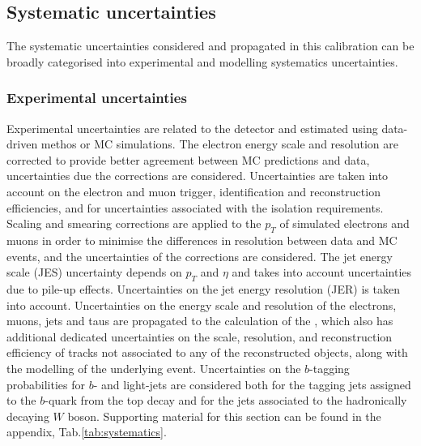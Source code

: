 \documentclass[letterpaper,12pt]{article}
\begin{document}
\subsection{Systematic uncertainties}
\label{sec:FTAG_systematics}
The systematic uncertainties considered and propagated in this calibration 
can be broadly categorised into experimental and modelling systematics uncertainties. 
\subsubsection{Experimental uncertainties}

Experimental uncertainties are related to the detector and estimated using 
data-driven methos or MC simulations. 
The electron energy scale and resolution are corrected to 
provide better agreement between MC predictions and data, uncertainties 
due the corrections are considered. Uncertainties are taken into account on the 
electron and muon trigger, identification and reconstruction efficiencies, and for 
uncertainties associated with the isolation requirements. 
Scaling and smearing corrections are applied 
to the $p_T$ of simulated electrons and muons in order to minimise the differences 
in resolution between data and MC events, and the uncertainties of the corrections are considered. 
The jet energy scale (JES) uncertainty depends on $p_T$ and $\eta$ and 
takes into account uncertainties due to pile-up effects. Uncertainties on the jet energy resolution (JER) 
is taken into account. Uncertainties on the energy scale and resolution of 
the electrons, muons, jets and taus are propagated to the calculation of the \MET, 
which also has additional dedicated uncertainties on the scale, resolution, and 
reconstruction efficiency of tracks not associated to any of the reconstructed objects,
 along with the modelling of the underlying event. Uncertainties on the $b$-tagging probabilities 
 for $b$- and light-jets are considered both for the tagging jets assigned to the $b$-quark 
 from the top decay and for the jets associated to the hadronically decaying $W$ boson.
Supporting material for this section can be found in the appendix, Tab.\ref{tab:systematics}.
\end{document}

